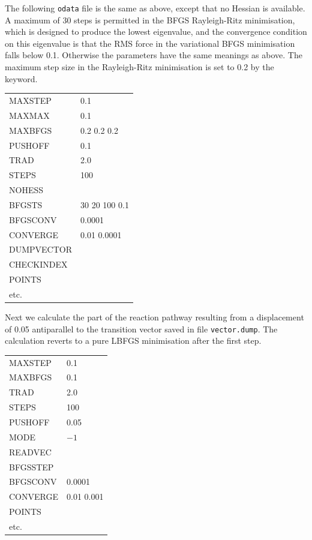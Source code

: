 {{{\noindent The following {\tt odata} file is the same as above, except that no Hessian is
available. A maximum of 30 steps is permitted in the BFGS Rayleigh-Ritz
minimisation, which is designed to produce the lowest eigenvalue, and the
convergence condition on this eigenvalue is that the RMS force in the variational BFGS
minimisation falls below 0.1.
Otherwise the parameters have the same meanings as above.
The maximum step size in the Rayleigh-Ritz minimisation is set to 0.2 by the
{} keyword.

\medskip
\begin{tabular}{ll}
 MAXSTEP & 0.1 \\
 MAXMAX  & 0.1 \\
 MAXBFGS & 0.2 0.2 0.2 \\
 PUSHOFF & 0.1 \\
 TRAD & 2.0 \\
 STEPS & 100 \\
 NOHESS \\
 BFGSTS & 30 20 100 0.1 \\
 BFGSCONV & 0.0001 \\
 CONVERGE & 0.01 0.0001 \\
 DUMPVECTOR \\
 CHECKINDEX \\
 POINTS \\
 etc. \\
\end{tabular}
\medskip

\noindent Next we calculate the part of the reaction pathway
resulting from a displacement of 0.05 antiparallel to the transition
vector saved in file {\tt vector.dump}. 
The calculation reverts to a pure LBFGS minimisation after the first step.

\medskip
\begin{tabular}{ll}
 MAXSTEP & 0.1 \\
 MAXBFGS & 0.1 \\
 TRAD & 2.0 \\
 STEPS & 100 \\
 PUSHOFF & 0.05 \\
 MODE & $-1$ \\
 READVEC \\
 BFGSSTEP \\
 BFGSCONV & 0.0001 \\
 CONVERGE & 0.01 0.001 \\
 POINTS \\
 etc. \\
\end{tabular}

}}}

